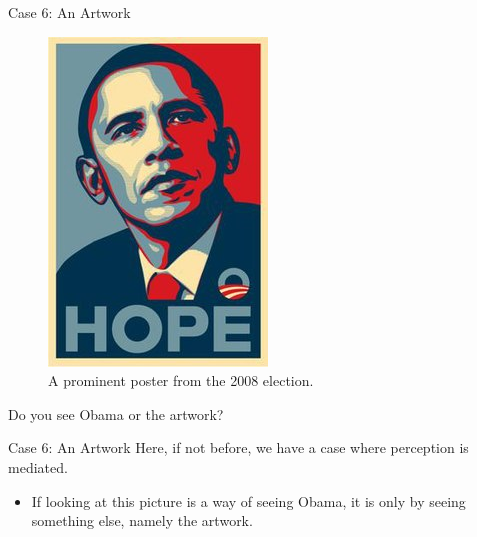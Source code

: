 \documentclass[
  17pt,
  letterpaper,
  ignorenonframetext,
  aspectratio=169,
  handout]{beamer}
\providecommand{\tightlist}{%
  \setlength{\itemsep}{0pt}\setlength{\parskip}{0pt}}\usepackage{longtable,booktabs,array}
\begin{document}
\begin{frame}{Case 6: An Artwork}
\protect\hypertarget{case-6-an-artwork}{}
\begin{figure}

{\centering \includegraphics[width=\textwidth,height=0.5\textheight]{../images/obama.jpg}

}

\caption{A prominent poster from the 2008 election.}

\end{figure}

Do you see Obama or the artwork?
\end{frame}

\begin{frame}{Case 6: An Artwork}
\protect\hypertarget{case-6-an-artwork-1}{}
Here, if not before, we have a case where perception is mediated.

\begin{itemize}[<+->]
\tightlist
\item
  If looking at this picture is a way of seeing Obama, it is only by
  seeing something else, namely the artwork.
\end{itemize}
\end{frame}
\end{document}
